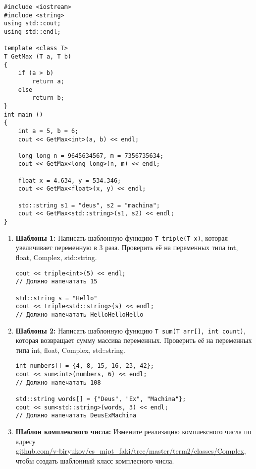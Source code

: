 \documentclass{article}
\begin{document}
\begin{lstlisting}
#include <iostream>
#include <string>
using std::cout;
using std::endl;

template <class T>
T GetMax (T a, T b) 
{
    if (a > b)
    	return a;
    else 
    	return b;
}
int main () 
{
    int a = 5, b = 6;
    cout << GetMax<int>(a, b) << endl;
    
    long long n = 9645634567, m = 7356735634;
    cout << GetMax<long long>(n, m) << endl;
    
    float x = 4.634, y = 534.346;
    cout << GetMax<float>(x, y) << endl;
    
    std::string s1 = "deus", s2 = "machina";
    cout << GetMax<std::string>(s1, s2) << endl;
}
\end{lstlisting}
\begin{enumerate}
\item \textbf{Шаблоны 1:} Написать шаблонную функцию \texttt{T triple(T x)}, которая увеличивает переменную в 3 раза. Проверить её на переменных типа int, float, Complex, std::string.
\begin{lstlisting}
cout << triple<int>(5) << endl;
// Должно напечатать 15
    
std::string s = "Hello"
cout << triple<std::string>(s) << endl;
// Должно напечатать HelloHelloHello
\end{lstlisting}
\item \textbf{Шаблоны 2:} Написать шаблонную функцию \texttt{T sum(T arr[], int count)}, которая возвращает сумму массива переменных. Проверить её на переменных типа int, float, Complex, std::string.
\begin{lstlisting}
int numbers[] = {4, 8, 15, 16, 23, 42};
cout << sum<int>(numbers, 6) << endl;
// Должно напечатать 108
    
std::string words[] = {"Deus", "Ex", "Machina"};
cout << sum<std::string>(words, 3) << endl;
// Должно напечатать DeusExMachina
\end{lstlisting}
\item \textbf{Шаблон комплексного числа:} Измените реализацию комплексного числа по адресу\\ \href{https://github.com/v-biryukov/cs_mipt_faki/tree/master/term2/classes/Complex}{github.com/v-biryukov/cs\_mipt\_faki/tree/master/term2/classes/Complex}, чтобы создать шаблонный класс комплесного числа.
\end{enumerate}

\newpage
\end{document}
